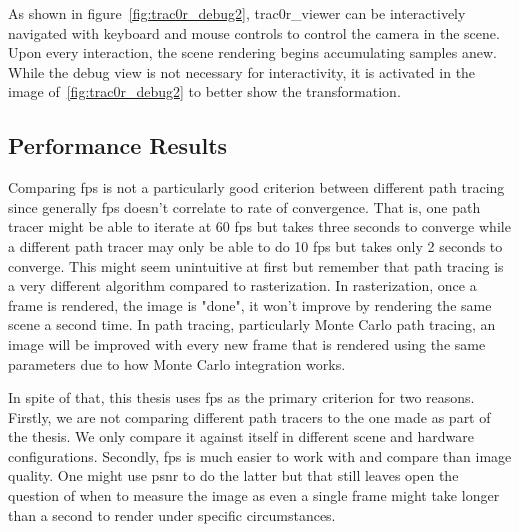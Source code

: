 \documentclass[
  twoside,
  11pt, a4paper,
  footinclude=true,
  headinclude=true,
  cleardoublepage=empty
]{scrreprt}
\begin{document}
As shown in figure~\ref{fig:trac0r_debug2}, trac0r\_viewer can be interactively navigated with
keyboard and mouse controls to control the camera in the scene. Upon every interaction, the scene
rendering begins accumulating samples anew. While the debug view is not necessary for
interactivity, it is activated in the image of~\ref{fig:trac0r_debug2} to better show the
transformation.

\subsection{Performance Results}
Comparing \ac{fps} is not a particularly good criterion between different path tracing since
generally \ac{fps} doesn't correlate to rate of convergence. That is, one path tracer might be able
to iterate at 60 \ac{fps} but takes three seconds to converge while a different path tracer may
only be able to do 10 \ac{fps} but takes only 2 seconds to converge. This might seem unintuitive at
first but remember that path tracing is a very different algorithm compared to rasterization. In
rasterization, once a frame is rendered, the image is "done", it won't improve by rendering the
same scene a second time. In path tracing, particularly Monte Carlo path tracing, an image will be
improved with every new frame that is rendered using the same parameters due to how Monte Carlo
integration works.

In spite of that, this thesis uses \ac{fps} as the primary criterion for two reasons. Firstly, we are not
comparing different path tracers to the one made as part of the thesis. We only compare it
against itself in different scene and hardware configurations. Secondly, \ac{fps} is much easier
to work with and compare than image quality. One might use \ac{psnr} to do the latter but that
still leaves open the question of when to measure the image as even a single frame might take
longer than a second to render under specific circumstances.
\end{document}
